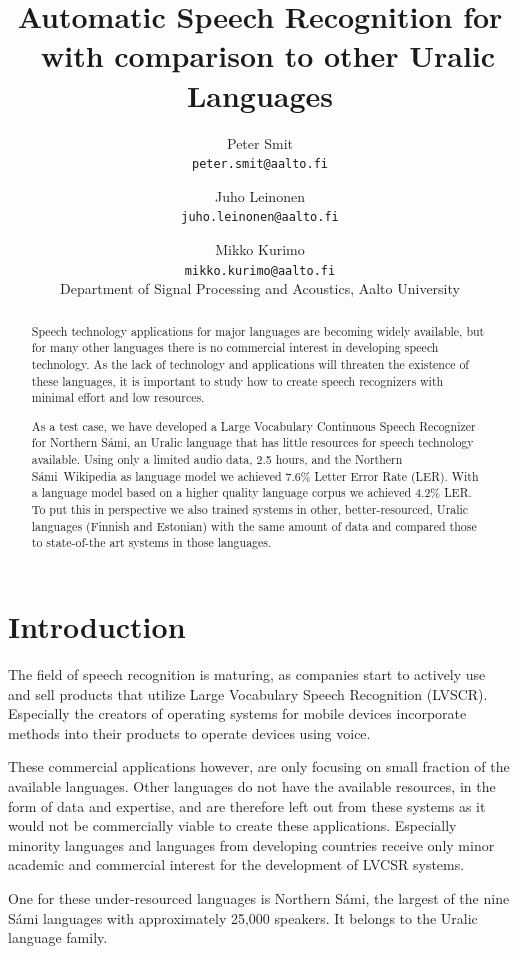 \documentclass[b5paper]{article}
\title{Automatic Speech Recognition for \ns\ with comparison to other Uralic Languages\blfootnote{
    This work is licensed under a Creative Commons Attribution–NoDerivatives
    4.0 International Licence.  Licence details:
    \url{http://creativecommons.org/licenses/by-nd/4.0/}
}}
\author{Peter Smit \\ \texttt{peter.smit@aalto.fi} \and Juho Leinonen \\ \texttt{juho.leinonen@aalto.fi} \and Mikko Kurimo\\ \texttt{mikko.kurimo@aalto.fi}  \\
[0.5cm]Department of Signal Processing and Acoustics, Aalto University\\}
\newcommand{\ns}{Northern Sámi}
\begin{document}
\maketitle

\begin{abstract} 
Speech technology applications for major languages are becoming widely available, but for many other languages there is no commercial interest in developing speech technology. As the lack of technology and applications will threaten the existence of these languages, it is important to study how to create speech recognizers with minimal effort and low resources.

As a test case, we have developed a Large Vocabulary Continuous Speech Recognizer for \ns, an Uralic language that has little resources for speech technology available. Using only a limited audio data, 2.5 hours, and the \ns\ Wikipedia as language model we achieved 7.6\% Letter Error Rate (LER). With a language model based on a higher quality language corpus we achieved 4.2\% LER. To put this in perspective we also trained systems in other, better-resourced, Uralic languages (Finnish and Estonian) with the same amount of data and compared those to state-of-the art systems in those languages. 
\end{abstract}

\section{Introduction}

The field of speech recognition is maturing, as companies start to actively use and sell products that utilize Large Vocabulary Speech Recognition (LVSCR). Especially the creators of operating systems for mobile devices incorporate methods into their products to operate devices using voice.

These commercial applications however, are only focusing on small fraction of the available languages. Other languages do not have the available resources, in the form of data and expertise, and are therefore left out from these systems as it would not be commercially viable to create these applications. Especially minority languages and languages from developing countries receive only minor academic and commercial interest for the development of LVCSR systems. \cite{besacier2014automatic}

One for these under-resourced languages is \ns, the largest of the nine Sámi languages with approximately 25,000 speakers. It belongs to the Uralic language family. \cite{ethno18}
\end{document}
